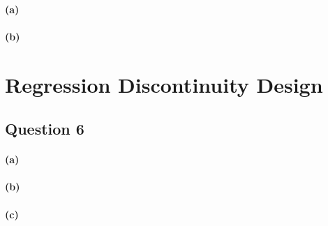 \documentclass{scrartcl}
\begin{document}
\paragraph*{(a)}

\paragraph*{(b)}

\section*{Regression Discontinuity Design}

\subsection*{Question 6}

\paragraph*{(a)}

\paragraph*{(b)}

\paragraph*{(c)}
\end{document}
